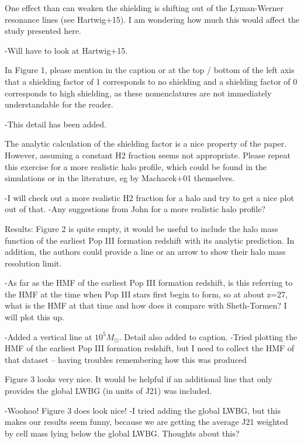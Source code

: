 \documentclass[11pt]{article}
\begin{document}
\begin{referee}
One effect than can weaken the shielding is shifting out of the Lyman-Werner 
resonance lines (see Hartwig+15). I am wondering how much this would affect the 
study presented here. 
\end{referee}
-Will have to look at Hartwig+15. 

\begin{referee}
In Figure 1, please mention in the caption or at the top / bottom of the left 
axis that a shielding factor of 1 corresponds to no shielding and a shielding 
factor of 0 corresponds to high shielding, as these nomenclatures are not 
immediately understandable for the reader.
\end{referee}
-This detail has been added. 

\begin{referee}
The analytic calculation of the shielding factor is a nice property of the 
paper. However, assuming a constant H2 fraction seems not appropriate. Please 
repeat this exercise for a more realistic halo profile, which could be found in 
the simulations or in the literature, eg by Machacek+01 themselves.
\end{referee}
-I will check out a more realistic H2 fraction for a halo and try to get a nice plot out of that.
-Any suggestions from John for a more realistic halo profile?

\begin{referee}
Results:
Figure 2 is quite empty, it would be useful to include the halo mass function of
 the earliest Pop III formation redshift with its analytic prediction. In 
 addition, the authors could provide a line or an arrow to show their halo mass 
 resolution limit.
\end{referee}
-As far as the HMF of the earliest Pop III formation redshift, is this referring to the HMF at the time when Pop III stars first begin to form, so at about z=27, what is the HMF at that time and how does it compare with Sheth-Tormen? I will plot this up.

-Added a vertical line at $10^5 M_{\odot}$. Detail also added to caption.
-Tried plotting the HMF of the earliest Pop III formation redshift, but I need to collect the HMF of that dataset -- having troubles remembering how this was produced 


\begin{referee}
Figure 3 looks very nice. It would be helpful if an additional line that only 
provides the global LWBG (in units of J21) was included.
\end{referee}
-Woohoo! Figure 3 does look nice!
-I tried adding the global LWBG, but this makes our results seem funny, because we are getting the average J21 weighted by cell mass lying below the global LWBG. Thoughts about this?
\end{document}
